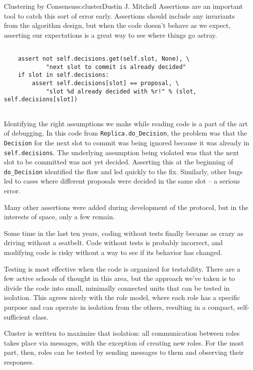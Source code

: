 \begin{aosachapter}{Clustering by Consensus}{s:cluster}{Dustin J. Mitchell}
Assertions are an important tool to catch this sort of error early.
Assertions should include any invariants from the algorithm design, but
when the code doesn't behave as we expect, asserting our expectations is
a great way to see where things go astray.

\begin{verbatim}

    assert not self.decisions.get(self.slot, None), \
            "next slot to commit is already decided"
    if slot in self.decisions:
        assert self.decisions[slot] == proposal, \
            "slot %d already decided with %r!" % (slot, self.decisions[slot])
    
\end{verbatim}

Identifying the right assumptions we make while reading code is a part
of the art of debugging. In this code from
\texttt{Replica.do\_Decision}, the problem was that the
\texttt{Decision} for the next slot to commit was being ignored because
it was already in \texttt{self.decisions}. The underlying assumption
being violated was that the next slot to be committed was not yet
decided. Asserting this at the beginning of \texttt{do\_Decision}
identified the flaw and led quickly to the fix. Similarly, other bugs
led to cases where different proposals were decided in the same slot --
a serious error.

Many other assertions were added during development of the protocol, but
in the interests of space, only a few remain.

\label{testing}

Some time in the last ten years, coding without tests finally became as
crazy as driving without a seatbelt. Code without tests is probably
incorrect, and modifying code is risky without a way to see if its
behavior has changed.

Testing is most effective when the code is organized for testability.
There are a few active schools of thought in this area, but the approach
we've taken is to divide the code into small, minimally connected units
that can be tested in isolation. This agrees nicely with the role model,
where each role has a specific purpose and can operate in isolation from
the others, resulting in a compact, self-sufficient class.

Cluster is written to maximize that isolation: all communication between
roles takes place via messages, with the exception of creating new
roles. For the most part, then, roles can be tested by sending messages
to them and observing their responses.


\end{aosachapter}
